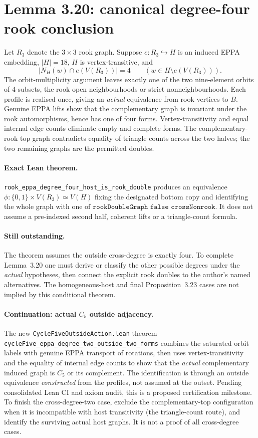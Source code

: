 \documentclass[11pt,a4paper]{article}
\begin{document}
\section*{Lemma 3.20: canonical degree-four rook conclusion}
Let \(R_3\) denote the \(3\times3\) rook graph.
Suppose \(e:R_3\hookrightarrow H\) is an
induced EPPA embedding, \(|H|=18\), \(H\) is
vertex-transitive, and
\[
  |N_H(w)\cap e(V(R_3))|=4
  \qquad(w\in H\setminus e(V(R_3))).
\]
The orbit-multiplicity argument leaves exactly one
of the two nine-element orbits of 4-subsets, the
rook open neighbourhoods or strict nonneighbourhoods.
Each profile is realised once, giving an \emph{actual}
equivalence from rook vertices to \(B\).
Genuine EPPA lifts show that the complementary
graph is invariant under the rook automorphisms,
hence has one of four forms. Vertex-transitivity
and equal internal edge counts eliminate empty
and complete forms. The complementary-rook
top graph contradicts equality of triangle counts
across the two halves; the two remaining graphs
are the permitted doubles.

\paragraph{Exact Lean theorem.}
\texttt{rook\_eppa\_degree\_four\_host\_is\_rook\_double}
produces an equivalence
\(\phi:\{0,1\}\times V(R_3)\simeq V(H)\)
fixing the designated bottom copy and identifying
the whole graph with one of
\(\texttt{rookDoubleGraph false crossNonrook}\).
It does not assume a pre-indexed second half,
coherent lifts or a triangle-count formula.

\paragraph{Still outstanding.}
The theorem assumes the outside cross-degree is
exactly four. To complete Lemma~3.20 one must
derive or classify the other possible degrees
under the \emph{actual} hypotheses, then connect
the explicit rook doubles to the author's named
alternatives. The homogeneous-host and final
Proposition~3.23 cases are not implied by this
conditional theorem.

\paragraph{Continuation: actual \(C_5\) outside adjacency.}
The new \texttt{CycleFiveOutsideAction.lean} theorem
\texttt{cycleFive\_eppa\_degree\_two\_outside\_two\_forms}
combines the saturated orbit labels with genuine
EPPA transport of rotations, then uses
vertex-transitivity and the equality of internal
edge counts to show that the \emph{actual}
complementary induced graph is \(C_5\) or its
complement. The identification is through an
outside equivalence \emph{constructed} from the
profiles, not assumed at the outset.
Pending consolidated Lean CI and axiom audit,
this is a proposed certification milestone.
To finish the cross-degree-two case, exclude
the complementary-top configuration when it
is incompatible with host transitivity (the
triangle-count route), and identify the
surviving actual host graphs. It is not a
proof of all cross-degree cases.
\end{document}
